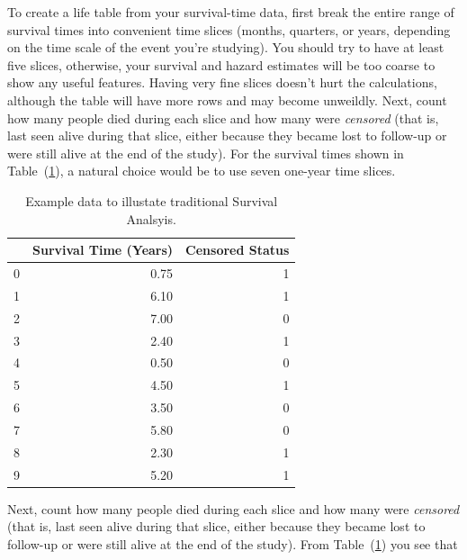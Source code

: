 \documentclass[a4paper,11pt]{article}
\begin{document}
To create a life table from your survival-time data, first break the entire range of survival times into convenient time slices (months, quarters, or years, depending on the time scale of the event you're studying). You should try to have at least five slices, otherwise, your survival and hazard estimates will be too coarse to show any useful features. Having very fine slices doesn't hurt the calculations, although the table will have more rows and may become unweildly. Next, count how many people died during each slice and how many were \textit{censored} (that is, last seen alive during that slice, either because they became lost to follow-up or were still alive at the end of the study).
For the survival times shown in Table~(\ref{tab:censoredexample}), a natural choice would be to use seven one-year time slices.


\begin{table}[tbp]
\begin{center}
\begin{tabular}{lrr}
\toprule
{} &  Survival Time (Years) &  Censored Status \\
\midrule
0 &            0.75 &                1 \\
1 &            6.10 &                1 \\
2 &            7.00 &                0 \\
3 &            2.40 &                1 \\
4 &            0.50 &                0 \\
5 &            4.50 &                1 \\
6 &            3.50 &                0 \\
7 &            5.80 &                0 \\
8 &            2.30 &                1 \\
9 &            5.20 &                1 \\
\bottomrule
\end{tabular}
\caption{\label{tab:censoredexample} Example data to illustate traditional Survival Analsyis.}
\end{center}
\end{table}


Next, count how many people died during each slice and how many were \textit{censored} (that is, last seen alive during that slice, either because they became lost to follow-up 
or were still alive at the end of the study). From Table~(\ref{tab:censoredexample}) you see that
\end{document}
